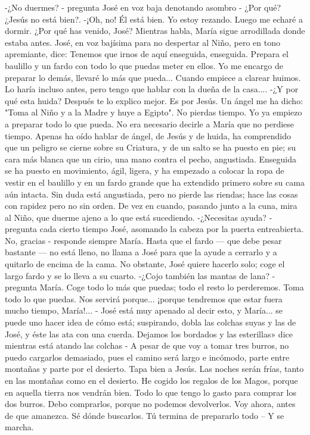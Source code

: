\documentclass[12pt]{book} %
\begin{document}
-¿No duermes? - pregunta José en voz baja denotando asombro - ¿Por qué? ¿Jesús no está bien?. 
-¡Oh, no! Él está bien. Yo estoy rezando. Luego me echaré a dormir. ¿Por qué has venido, José? Mientras habla, María sigue arrodillada donde estaba antes. 
José, en voz bajísima para no despertar al Niño, pero en tono apremiante, dice: 
Tenemos que irnos de aquí enseguida, enseguida. Prepara el baulillo y un fardo con todo lo que puedas meter en ellos. Yo me encargo de preparar lo demás, llevaré lo más que pueda... Cuando empiece a clarear huimos. Lo haría incluso antes, pero tengo que hablar con la dueña de la casa.... 
-¿Y por qué esta huida? 
Después te lo explico mejor. Es por Jesús. Un ángel me ha dicho: "Toma al Niño y a la Madre y huye a Egipto". No 
pierdas tiempo. Yo ya empiezo a preparar todo lo que pueda. 
No era necesario decirle a María que no perdiese tiempo. Apenas ha oído hablar de ángel, de Jesús y de huida, ha 
comprendido que un peligro se cierne sobre su Criatura, y de un salto se ha puesto en pie; su cara más blanca que un cirio, una mano contra el pecho, angustiada. Enseguida se ha puesto en movimiento, ágil, ligera, y ha empezado a colocar la ropa de vestir en el baulillo y en un fardo grande que ha extendido primero sobre su cama aún intacta. Sin duda está angustiada, pero no pierde las riendas; hace las cosas con rapidez pero no sin orden. De vez en cuando, pasando junto a la cuna, mira al Niño, que duerme ajeno a lo que está sucediendo. 
-¿Necesitas ayuda? - pregunta cada cierto tiempo José, asomando la cabeza por la puerta entreabierta. 
No, gracias - responde siempre María. 
Hasta que el fardo — que debe pesar bastante — no está lleno, no llama a José para que la ayude a cerrarlo y a quitarlo 
de encima de la cama. No obstante, José quiere hacerlo solo; coge el largo fardo y se lo lleva a su cuarto. 
-¿Cojo también las mantas de lana? - pregunta María. 
Coge todo lo más que puedas; todo el resto lo perderemos. Toma todo lo que puedas. Nos servirá porque... ¡porque 
tendremos que estar fuera mucho tiempo, María!... - José está muy apenado al decir esto, y María... se puede uno hacer idea de cómo está; suspirando, dobla las colchas suyas y las de José, y éste las ata con una cuerda. 
Dejamos los bordados y las esterillas» dice mientras está atando las colchas - A pesar de que voy a tomar tres burros, 
no puedo cargarlos demasiado, pues el camino será largo e incómodo, parte entre montañas y parte por el desierto. Tapa bien a Jesús. Las noches serán frías, tanto en las montañas como en el desierto. He cogido los regalos de los Magos, porque en aquella tierra nos vendrán bien. Todo lo que tengo lo gasto para comprar los dos burros. Debo comprarlos, porque no podemos devolverlos. Voy ahora, antes de que amanezca. Sé dónde buscarlos. Tú termina de prepararlo todo – Y se marcha.                     
\end{document}
